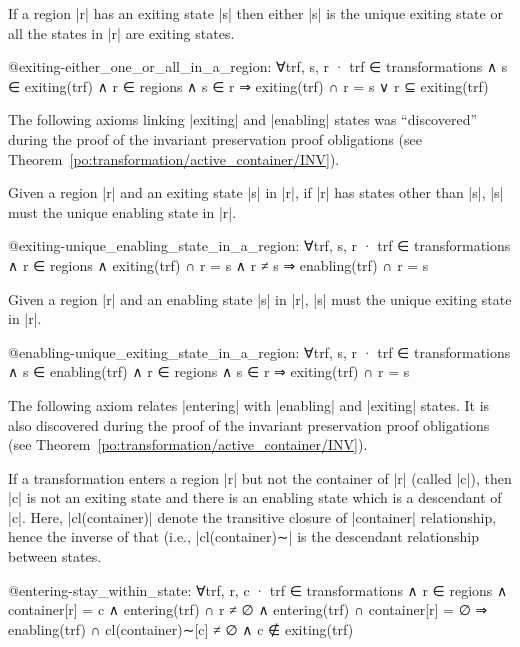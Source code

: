 \begin{axiom}
\label{axm:@exiting-either_one_or_all_in_a_region}
If a region |r| has an exiting state |s| then either |s| is the unique exiting state or all the states in |r| are exiting states.
\begin{EventBcode}
@exiting-either_one_or_all_in_a_region: 
    ∀trf, s, r · trf ∈ transformations ∧ s ∈ exiting(trf) ∧ r ∈ regions ∧ s ∈ r
        ⇒ exiting(trf) ∩ r = {s} ∨ r ⊆ exiting(trf)
\end{EventBcode}
\end{axiom}

The following axioms linking |exiting| and |enabling| states was ``discovered'' during the proof of the invariant preservation proof obligations (see Theorem~\ref{po:transformation/active_container/INV}).
\begin{axiom}
\label{axm:@exiting-unique_enabling_state_in_a_region}
Given a region |r| and an exiting state |s| in |r|, if |r| has states other than |s|, |s| must the unique enabling state in |r|.
\begin{EventBcode}
@exiting-unique_enabling_state_in_a_region:
    ∀trf, s, r · trf ∈ transformations ∧ r ∈ regions ∧ exiting(trf) ∩ r = {s} ∧ r ≠ {s}
        ⇒ enabling(trf) ∩ r = {s}
\end{EventBcode}
\end{axiom}
\begin{axiom}
\label{axm:@enabling-unique_exiting_state_in_a_region}
Given a region |r| and an enabling state |s| in |r|, |s| must the unique exiting state in |r|.
\begin{EventBcode}
@enabling-unique_exiting_state_in_a_region:
    ∀trf, s, r · trf ∈ transformations ∧ s ∈ enabling(trf) ∧ r ∈ regions ∧ s ∈ r
        ⇒ exiting(trf) ∩ r = {s}
\end{EventBcode}
\end{axiom}

The following axiom relates |entering| with |enabling| and |exiting| states. It is also discovered during the proof of the invariant preservation proof obligations (see Theorem~\ref{po:transformation/active_container/INV}).
\begin{axiom}
\label{axm:@entering-stay_within_state}
If a transformation enters a region |r| but not the container of |r| (called |c|), then |c| is not an exiting state and there is an enabling state which is a descendant of |c|. Here, |cl(container)| denote the transitive closure of |container| relationship, hence the inverse of that (i.e., |cl(container)∼| is the descendant relationship between states.
\begin{EventBcode}
@entering-stay_within_state:
    ∀trf, r, c · trf ∈ transformations ∧ r ∈ regions ∧ container[r] = {c} ∧
    entering(trf) ∩ r ≠ ∅ ∧ entering(trf) ∩ container[r] = ∅
        ⇒ enabling(trf) ∩ cl(container)∼[{c}] ≠ ∅ ∧ c ∉ exiting(trf) 
\end{EventBcode}
\end{axiom}


